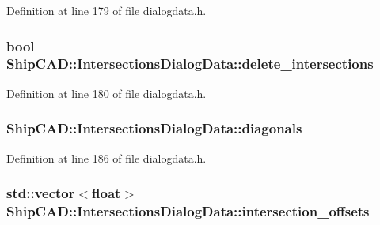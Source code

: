Definition at line 179 of file dialogdata.\+h.

\subsubsection[{\texorpdfstring{delete\+\_\+intersections}{delete_intersections}}]{\setlength{\rightskip}{0pt plus 5cm}bool Ship\+C\+A\+D\+::\+Intersections\+Dialog\+Data\+::delete\+\_\+intersections}\hypertarget{structShipCAD_1_1IntersectionsDialogData_a0b612a856d1875fb0062907fb1cc77a7}{}\label{structShipCAD_1_1IntersectionsDialogData_a0b612a856d1875fb0062907fb1cc77a7}


Definition at line 180 of file dialogdata.\+h.

\subsubsection[{\texorpdfstring{diagonals}{diagonals}}]{ Ship\+C\+A\+D\+::\+Intersections\+Dialog\+Data\+::diagonals}\hypertarget{structShipCAD_1_1IntersectionsDialogData_aa646939995a2b52262724964a6e1fd47}{}\label{structShipCAD_1_1IntersectionsDialogData_aa646939995a2b52262724964a6e1fd47}


Definition at line 186 of file dialogdata.\+h.

\subsubsection[{\texorpdfstring{intersection\+\_\+offsets}{intersection_offsets}}]{\setlength{\rightskip}{0pt plus 5cm}std\+::vector$<$float$>$ Ship\+C\+A\+D\+::\+Intersections\+Dialog\+Data\+::intersection\+\_\+offsets}\hypertarget{structShipCAD_1_1IntersectionsDialogData_ac2a5677d64845ff41b99f05f590170f8}{}\label{structShipCAD_1_1IntersectionsDialogData_ac2a5677d64845ff41b99f05f590170f8}


